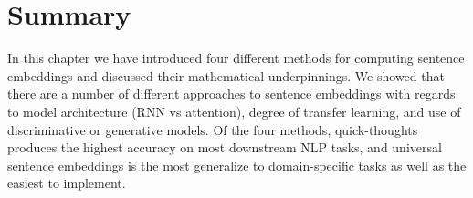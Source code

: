 \section{\label{sec:level6} Summary}

In this chapter we have introduced four different methods for computing sentence embeddings and discussed their mathematical underpinnings. We showed that there are a number of different approaches to sentence embeddings with regards to model architecture (RNN vs attention), degree of transfer learning, and use of discriminative or generative models. Of the four methods, quick-thoughts produces the highest accuracy on most downstream NLP tasks, and universal sentence embeddings is the most generalize to domain-specific tasks as well as the easiest to implement.